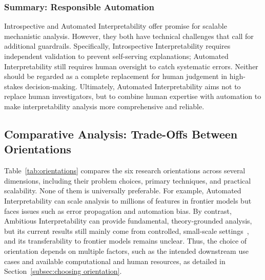 \subsubsection{Summary: Responsible Automation}

Introspective and Automated Interpretability offer promise for scalable mechanistic analysis. However, they both have technical challenges that call for additional guardrails. Specifically, Introspective Interpretability requires independent validation to prevent self-serving explanations; Automated Interpretability still requires human oversight to catch systematic errors. Neither should be regarded as a complete replacement for human judgement in high-stakes decision-making. Ultimately, Automated Interpretability aims not to replace human investigators, but to combine human expertise with automation to make interpretability analysis more comprehensive and reliable.

\subsection{Comparative Analysis: Trade-Offs Between Orientations}
Table~\ref{tab:orientations} compares the six research orientations across several dimensions, including their problem choices, primary techniques, and practical scalability. None of them is universally preferable. For example, Automated Interpretability can scale analysis to millions of features in frontier models but faces issues such as error propagation and automation bias. By contrast, Ambitious Interpretability can provide fundamental, theory-grounded analysis, but its current results still mainly come from controlled, small-scale settings~, and its transferability to frontier models remains unclear. Thus, the choice of orientation depends on multiple factors, such as the intended downstream use cases and available computational and human resources, as detailed in Section~\ref{subsec:choosing orientation}.

